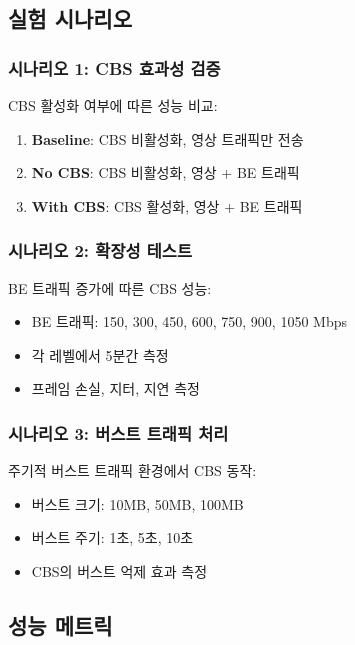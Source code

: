 \documentclass[twocolumn,10pt]{article}
\begin{document}
\subsection{실험 시나리오}

\subsubsection{시나리오 1: CBS 효과성 검증}

CBS 활성화 여부에 따른 성능 비교:

\begin{enumerate}
    \item \textbf{Baseline}: CBS 비활성화, 영상 트래픽만 전송
    \item \textbf{No CBS}: CBS 비활성화, 영상 + BE 트래픽
    \item \textbf{With CBS}: CBS 활성화, 영상 + BE 트래픽
\end{enumerate}

\subsubsection{시나리오 2: 확장성 테스트}

BE 트래픽 증가에 따른 CBS 성능:

\begin{itemize}
    \item BE 트래픽: 150, 300, 450, 600, 750, 900, 1050 Mbps
    \item 각 레벨에서 5분간 측정
    \item 프레임 손실, 지터, 지연 측정
\end{itemize}

\subsubsection{시나리오 3: 버스트 트래픽 처리}

주기적 버스트 트래픽 환경에서 CBS 동작:

\begin{itemize}
    \item 버스트 크기: 10MB, 50MB, 100MB
    \item 버스트 주기: 1초, 5초, 10초
    \item CBS의 버스트 억제 효과 측정
\end{itemize}

\subsection{성능 메트릭}
\end{document}
